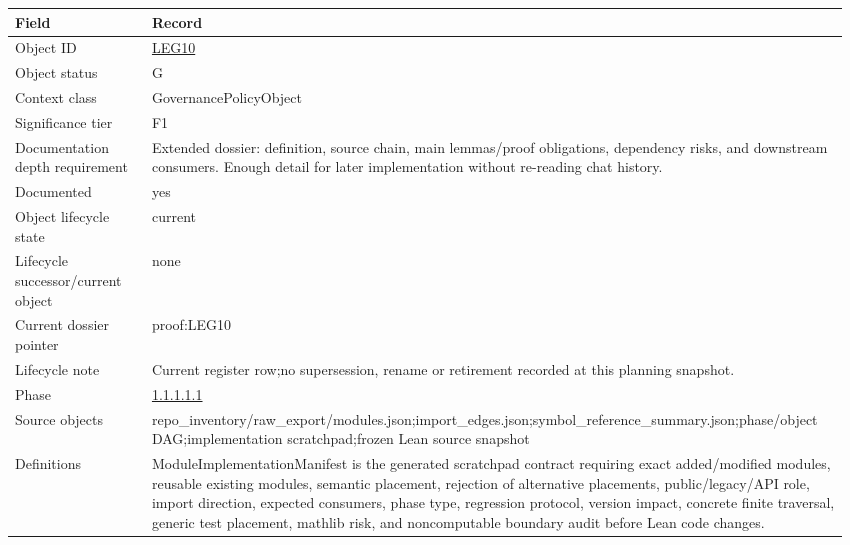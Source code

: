 \begin{longtable}{L{0.16\linewidth} L{0.81\linewidth}}
\hline
\textbf{Field} & \textbf{Record}\\
\hline
Object ID & \hyperlink{object-row-LEG10}{LEG10}\\
\hline\addlinespace[0.20em]
Object status & G\\
\hline\addlinespace[0.20em]
Context class & GovernancePolicyObject\\
\hline\addlinespace[0.20em]
Significance tier & F1\\
\hline\addlinespace[0.20em]
Documentation depth requirement & Extended dossier: definition, source chain, main lemmas/\allowbreak{}proof obligations, dependency risks, and downstream consumers. Enough detail for later implementation without re-reading chat history.\\
\hline\addlinespace[0.20em]
Documented & yes\\
\hline\addlinespace[0.20em]
Object lifecycle state & current\\
\hline\addlinespace[0.20em]
Lifecycle successor/\allowbreak{}current object & none\\
\hline\addlinespace[0.20em]
Current dossier pointer & proof:LEG10\\
\hline\addlinespace[0.20em]
Lifecycle note & Current register row;\newline no supersession, rename or retirement recorded at this planning snapshot.\\
\hline\addlinespace[0.20em]
Phase & \hyperlink{phase-row-1-1-1-1-1}{1.1.1.1.1}\\
\hline\addlinespace[0.20em]
Source objects & repo\_inventory/\allowbreak{}raw\_export/\allowbreak{}modules.json;\newline import\_edges.json;\newline symbol\_reference\_summary.json;\newline phase/\allowbreak{}object DAG;\newline implementation scratchpad;\newline frozen Lean source snapshot\\
\hline\addlinespace[0.20em]
Definitions & ModuleImplementationManifest is the generated scratchpad contract requiring exact added/\allowbreak{}modified modules, reusable existing modules, semantic placement, rejection of alternative placements, public/\allowbreak{}legacy/\allowbreak{}API role, import direction, expected consumers, phase type, regression protocol, version impact, concrete finite traversal, generic test placement, mathlib risk, and noncomputable boundary audit before Lean code changes.\\

\end{longtable}

